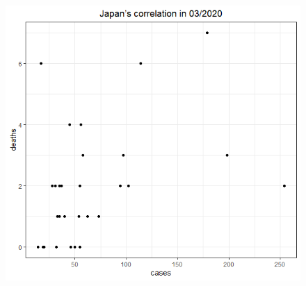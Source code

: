 \documentclass[a4paper]{article}
\theoremstyle{definition}
\begin{document}
\begin{enumerate}[1)]
\begin{figure}[H]
\begin{center}
        \includegraphics[scale = 0.3]{ix/ix.2/JPN_03_2020.png}
        

\end{center}
\end{figure}
\end{enumerate}
\end{document}
